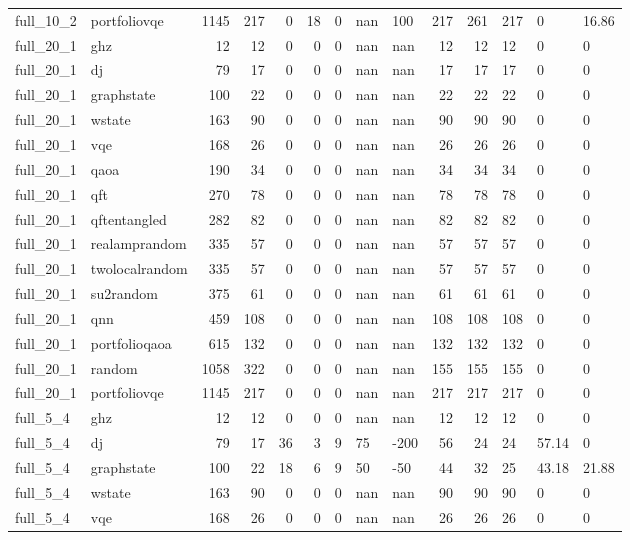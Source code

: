 \begin{longtable}{llrrrrlllrrlll}
full\_10\_2 & portfoliovqe & 1145 & 217 & 0 & 18 & 0 & nan & 100 & 217 & 261 & 217 & 0 & 16.86 \\
full\_20\_1 & ghz & 12 & 12 & 0 & 0 & 0 & nan & nan & 12 & 12 & 12 & 0 & 0 \\
full\_20\_1 & dj & 79 & 17 & 0 & 0 & 0 & nan & nan & 17 & 17 & 17 & 0 & 0 \\
full\_20\_1 & graphstate & 100 & 22 & 0 & 0 & 0 & nan & nan & 22 & 22 & 22 & 0 & 0 \\
full\_20\_1 & wstate & 163 & 90 & 0 & 0 & 0 & nan & nan & 90 & 90 & 90 & 0 & 0 \\
full\_20\_1 & vqe & 168 & 26 & 0 & 0 & 0 & nan & nan & 26 & 26 & 26 & 0 & 0 \\
full\_20\_1 & qaoa & 190 & 34 & 0 & 0 & 0 & nan & nan & 34 & 34 & 34 & 0 & 0 \\
full\_20\_1 & qft & 270 & 78 & 0 & 0 & 0 & nan & nan & 78 & 78 & 78 & 0 & 0 \\
full\_20\_1 & qftentangled & 282 & 82 & 0 & 0 & 0 & nan & nan & 82 & 82 & 82 & 0 & 0 \\
full\_20\_1 & realamprandom & 335 & 57 & 0 & 0 & 0 & nan & nan & 57 & 57 & 57 & 0 & 0 \\
full\_20\_1 & twolocalrandom & 335 & 57 & 0 & 0 & 0 & nan & nan & 57 & 57 & 57 & 0 & 0 \\
full\_20\_1 & su2random & 375 & 61 & 0 & 0 & 0 & nan & nan & 61 & 61 & 61 & 0 & 0 \\
full\_20\_1 & qnn & 459 & 108 & 0 & 0 & 0 & nan & nan & 108 & 108 & 108 & 0 & 0 \\
full\_20\_1 & portfolioqaoa & 615 & 132 & 0 & 0 & 0 & nan & nan & 132 & 132 & 132 & 0 & 0 \\
full\_20\_1 & random & 1058 & 322 & 0 & 0 & 0 & nan & nan & 155 & 155 & 155 & 0 & 0 \\
full\_20\_1 & portfoliovqe & 1145 & 217 & 0 & 0 & 0 & nan & nan & 217 & 217 & 217 & 0 & 0 \\
full\_5\_4 & ghz & 12 & 12 & 0 & 0 & 0 & nan & nan & 12 & 12 & 12 & 0 & 0 \\
full\_5\_4 & dj & 79 & 17 & 36 & 3 & 9 & 75 & -200 & 56 & 24 & 24 & 57.14 & 0 \\
full\_5\_4 & graphstate & 100 & 22 & 18 & 6 & 9 & 50 & -50 & 44 & 32 & 25 & 43.18 & 21.88 \\
full\_5\_4 & wstate & 163 & 90 & 0 & 0 & 0 & nan & nan & 90 & 90 & 90 & 0 & 0 \\
full\_5\_4 & vqe & 168 & 26 & 0 & 0 & 0 & nan & nan & 26 & 26 & 26 & 0 & 0 \\

\end{longtable}
